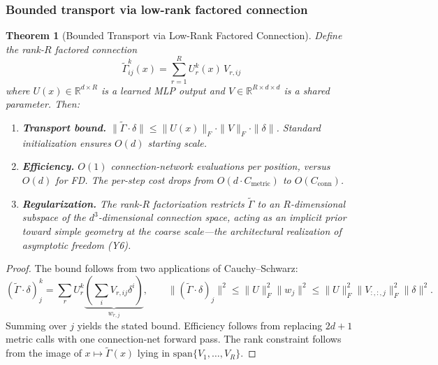 \documentclass[11pt,a4paper]{article}
\newtheorem{theorem}{Theorem}[section]
\theoremstyle{definition}
\theoremstyle{remark}
\begin{document}
\subsubsection{Bounded transport via low-rank factored connection}

\begin{theorem}[Bounded Transport via Low-Rank Factored 
Connection]\label{thm:lowrank_main}
Define the rank-$R$ factored connection
\begin{equation}\label{eq:lowrank_gamma_main}
    \tilde{\Gamma}^k_{ij}(x) = \sum_{r=1}^{R} U^k_r(x) \, 
    V_{r,ij}
\end{equation}
where $U(x) \in \mathbb{R}^{d \times R}$ is a learned MLP output 
and $V \in \mathbb{R}^{R \times d \times d}$ is a shared parameter. 
Then:
\begin{enumerate}
    \item \textbf{Transport bound.}
    $\|\tilde{\Gamma} \cdot \delta\| \leq 
    \|U(x)\|_F \cdot \|V\|_F \cdot \|\delta\|$.
    Standard initialization ensures $O(d)$ starting scale.
    
    \item \textbf{Efficiency.} $O(1)$ connection-network 
    evaluations per position, versus $O(d)$ for FD. The 
    per-step cost drops from $O(d \cdot C_{\mathrm{metric}})$ 
    to $O(C_{\mathrm{conn}})$.
    
    \item \textbf{Regularization.} The rank-$R$ factorization 
    restricts $\tilde{\Gamma}$ to an $R$-dimensional subspace of 
    the $d^3$-dimensional connection space, acting as an implicit 
    prior toward simple geometry at the coarse scale---the 
    architectural realization of asymptotic freedom (Y6).
\end{enumerate}
\end{theorem}

\begin{proof}
The bound follows from two applications of Cauchy--Schwarz:
\[
    (\tilde{\Gamma} \cdot \delta)^k_j 
    = \sum_r U^k_r \underbrace{\!\left(\sum_i V_{r,ij} 
    \delta^i\right)\!}_{w_{r,j}},
    \qquad
    \|(\tilde{\Gamma} \cdot \delta)_j\|^2 
    \leq \|U\|_F^2 \|w_j\|^2
    \leq \|U\|_F^2 \|V_{:,:,j}\|_F^2 \|\delta\|^2.
\]
Summing over $j$ yields the stated bound. Efficiency follows 
from replacing $2d + 1$ metric calls with one connection-net 
forward pass. The rank constraint follows from the image of 
$x \mapsto \tilde{\Gamma}(x)$ lying in 
$\mathrm{span}\{V_1, \ldots, V_R\}$.
\end{proof}
\end{document}
